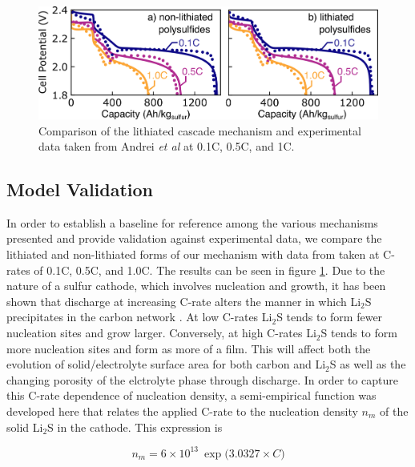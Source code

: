 \documentclass{elsarticle}
\begin{document}
\begin{center}
\begin{figure}[b]
    \centering
    \includegraphics[width=\textwidth]{Figures/Figure3_validation.png}
    \caption{Comparison of the lithiated cascade mechanism and experimental data taken from Andrei \textit{et al} \cite{ANDREI2018469} at 0.1C, 0.5C, and 1C.}
    \label{fig:lithiatedcascadevalidation}
\end{figure}
\end{center}

\subsection{Model Validation}
In order to establish a baseline for reference among the various mechanisms presented  and provide validation against experimental data, we compare the lithiated and non-lithiated forms of our mechanism with data from \cite{ANDREI2018469} taken at C-rates of 0.1C, 0.5C, and 1.0C. The results can be seen in figure \ref{fig:lithiatedcascadevalidation}. Due to the nature of a sulfur cathode, which involves nucleation and growth, it has been shown that discharge at increasing C-rate alters the manner in which Li$_2$S precipitates in the carbon network \cite{REN2016115}. At low C-rates Li$_2$S tends to form fewer nucleation sites and grow larger. Conversely, at high C-rates Li$_2$S tends to form more nucleation sites and form as more of a film. This will affect both the evolution of solid/electrolyte surface area for both carbon and Li$_2$S as well as the changing porosity of the elctrolyte phase through discharge. In order to capture this C-rate dependence of nucleation density, a semi-empirical function was developed here that relates the applied C-rate to the nucleation density $n_m$ of the solid Li$_2$S in the cathode. This expression is 

\begin{equation}\label{eq:li2s_nucl}
    n_m = 6 \times 10^{13} ~ \exp \big( 3.0327 \times C \big)
\end{equation}
\end{document}
